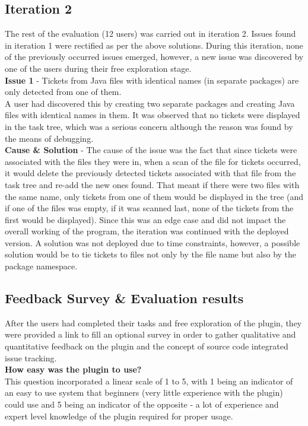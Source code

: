 \documentclass{4thYearProject}
\begin{document}
\subsection{Iteration 2}

The rest of the evaluation (12 users) was carried out in iteration 2. Issues found in iteration 1 were rectified as per the above solutions. During this iteration, none of the previously occurred issues emerged, however, a new issue was discovered by one of the users during their free exploration stage. \\
\newline
\textbf{Issue 1} - Tickets from Java files with identical names (in separate packages) are only detected from one of them.\\
\newline
A user had discovered this by creating two separate packages and creating Java files with identical names in them. It was observed that no tickets were displayed in the task tree, which was a serious concern although the reason was found by the means of debugging. \\
\newline
\textbf{Cause \& Solution} - The cause of the issue was the fact that since tickets were associated with the files they were in, when a scan of the file for tickets occurred, it would delete the previously detected tickets associated with that file from the task tree and re-add the new ones found. That meant if there were two files with the same name, only tickets from one of them would be displayed in the tree (and if one of the files was empty, if it was scanned last, none of the tickets from the first would be displayed).  Since this was an edge case and did not impact the overall working of the program, the iteration was continued with the deployed version. A solution was not deployed due to time constraints, however, a possible solution would be to tie tickets to files not only by the file name but also by the package namespace.

\subsection{Feedback Survey \& Evaluation results}

After the users had completed their tasks and free exploration of the plugin, they were provided a link to fill an optional survey in order to gather qualitative and quantitative feedback on the plugin and the concept of source code integrated issue tracking.\\
\newline
\textbf{How easy was the plugin to use?}\\
This question incorporated a linear scale of 1 to 5, with 1 being an indicator of an easy to use system that beginners (very little experience with the plugin) could use and 5 being an indicator of the opposite - a lot of experience and expert level knowledge of the plugin required for proper usage.   
\end{document}
